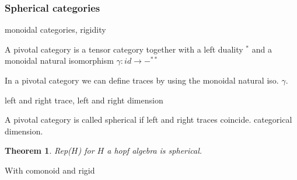 \documentclass{article}
\newtheorem{theorem}{Theorem}[section]
\newenvironment{proof}[1][Proof]{\begin{trivlist}
\item[\hskip \labelsep {\bfseries #1}]}{\end{trivlist}}
\newenvironment{definition}[1][Definition]{\begin{trivlist}
\item[\hskip \labelsep {\bfseries #1}]}{\end{trivlist}}
\begin{document}
\subsubsection{Spherical categories}
\begin{definition}
monoidal categories, rigidity
\end{definition}
\begin{definition}
A pivotal category is a tensor category together with a left duality $^*$ and a monoidal natural isomorphism $\gamma:id \rightarrow -^{**}$
\end{definition}
In a pivotal category we can define traces by using the monoidal natural iso. $\gamma$.
\begin{definition}
left and right trace, left and right dimension
\end{definition}
\begin{definition}
A pivotal category is called spherical if left and right traces coincide. categorical dimension.
\end{definition}
\begin{theorem}
Rep($H$) for $H$ a hopf algebra is spherical.
\end{theorem}
\begin{proof}
With comonoid and rigid
\end{proof}
\end{document}
